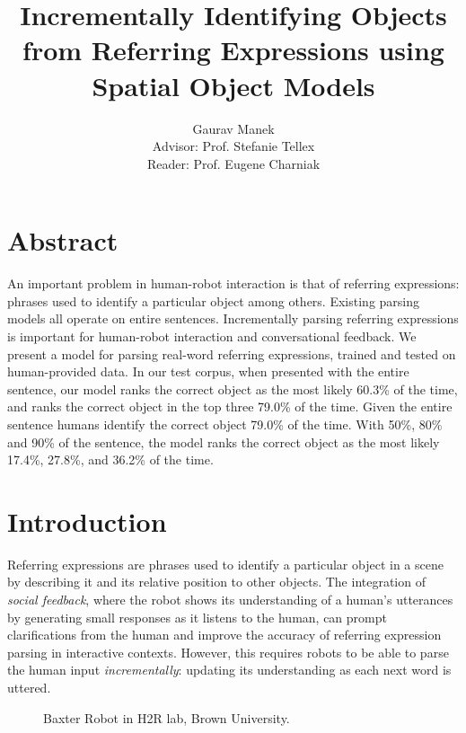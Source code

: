 \documentclass[conference]{IEEEtran}
\title{Incrementally Identifying Objects from Referring Expressions using Spatial Object Models}
\author{Gaurav Manek\\Advisor: Prof. Stefanie Tellex\\Reader: Prof. Eugene Charniak}
\numberwithin{equation}{section}
\begin{document}
\maketitle

\section{Abstract}
An important problem in human-robot interaction is that of referring expressions: phrases used to identify a particular object among others. Existing parsing models all operate on entire sentences. Incrementally parsing referring expressions is important for human-robot interaction and conversational feedback. We present a model for parsing real-word referring expressions, trained and tested on human-provided data. In our test corpus, when presented with the entire sentence, our model ranks the correct object as the most likely 60.3\% of the time, and ranks the correct object in the top three 79.0\% of the time. Given the entire sentence humans identify the correct object 79.0\% of the time. With 50\%, 80\% and 90\% of the sentence, the model ranks the correct object as the most likely 17.4\%, 27.8\%, and 36.2\% of the time.


\section{Introduction}

Referring expressions are phrases used to identify a particular object in a scene by describing it and its relative position to other objects. The integration of \emph{social feedback}, where the robot shows its understanding of a human's utterances by generating small responses as it listens to the human, can prompt clarifications from the human and improve the accuracy of referring expression parsing in interactive contexts. However, this requires robots to be able to parse the human input \emph{incrementally}: updating its understanding as each next word is uttered. 


\begin{figure}[!tb]
  \centering
  \label{fig:robot}

  \caption{Baxter Robot in H2R lab, Brown University.}
\end{figure}
\end{document}
